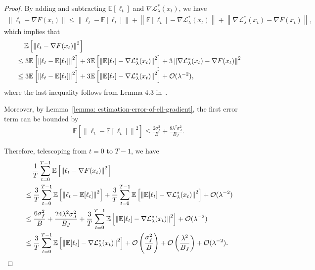 \documentclass{article}
\theoremstyle{plain}
\theoremstyle{definition}
\theoremstyle{remark}
\def\E{\mathbb E}
\def\cL{\mathcal L}
\def\cO{\mathcal O}
\begin{document}
\begin{proof}
    By adding and subtracting $\E[\ell_t]$ and $\nabla \cL_\lambda^*(x_t)$, we have
    \begin{align}
         \left\| \ell_t - \nabla F(x_t)\right\|  \leq \left\| \ell_t - \E [\ell_t]\right\| + \left\| \E [\ell_t] - \nabla \cL_\lambda^*(x_t)\right\| + \left\|\nabla \cL_\lambda^*(x_t) - \nabla F(x_t)\right\| ,
    \end{align}
    which implies that 
    \begin{align}
       & \quad \, \E \left[  \left\| \ell_t - \nabla F(x_t)\right\|^2  \right] \notag \\
       & \leq 3 \E \left[ \left\| \ell_t - \E [\ell_t]\right\|^2 \right] + 3 \E \left[ \left\| \E [\ell_t] - \nabla \cL_\lambda^*(x_t)\right\|^2 \right] + 3 \left\|\nabla \cL_\lambda^*(x_t) - \nabla F(x_t)\right\|^2 \notag \\
       & \leq  3 \E \left[ \left\| \ell_t - \E [\ell_t]\right\|^2 \right] + 3 \E \left[ \left\| \E [\ell_t] - \nabla \cL_\lambda^*(x_t)\right\|^2 \right] + \cO(\lambda^{-2}),
    \end{align}
    where the last inequality follows from Lemma 4.3 in~\citet{chen2024finding}. 

    Moreover, by Lemma~\ref{lemma: estimation-error-of-ell-gradient}, the first error term can be bounded by
    \begin{align}
         \E \left[ \left\| \ell_t - \E [\ell_t]\right\|^2 \right]  \leq \frac{2\sigma_f^2}{B} + \frac{8 \lambda^2 \sigma_J^2}{B_J}.
    \end{align}


    Therefore, telescoping from $t=0$ to $T-1$, we have
    \begin{align}
        & \quad \, \frac{1}{T}\sum_{t=0}^{T-1} \E \left[ \left\|\ell_{t} - \nabla F(x_{t})  \right\|^2 \right] \notag \\
        & \leq \frac{3}{T}\sum_{t=0}^{T-1} \E \left[ \left\| \ell_t - \E [\ell_t]\right\|^2 \right] + \frac{3}{T}\sum_{t=0}^{T-1} \E \left[ \left\| \E [\ell_t] - \nabla \cL_\lambda^*(x_t)\right\|^2 \right] + \cO(\lambda^{-2}) \notag \\
        & \leq \frac{6\sigma_f^2}{B} + \frac{24 \lambda^2 \sigma_J^2}{B_J}  + \frac{3}{T}\sum_{t=0}^{T-1} \E \left[ \left\| \E [\ell_t] - \nabla \cL_\lambda^*(x_t)\right\|^2 \right] + \cO(\lambda^{-2}) \notag \\
        & \leq \frac{3}{T}\sum_{t=0}^{T-1} \E \left[ \left\| \E [\ell_t] - \nabla \cL_\lambda^*(x_t)\right\|^2 \right] + \cO\left(\frac{\sigma_f^2}{B}\right) + \cO\left(\frac{\lambda^2}{B_J}\right) + \cO(\lambda^{-2}) .
    \end{align}

\end{proof}
\end{document}
